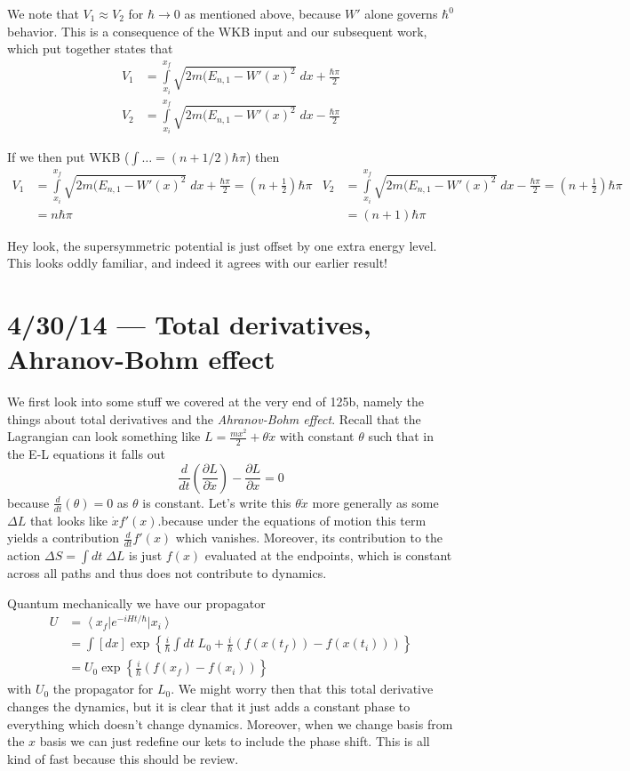 \documentclass[10pt]{report}
\newcommand{\bra}[1]{\left<#1\right|}
\newcommand{\ket}[1]{\left|#1\right>}
\newcommand{\rd}[2]{\frac{d#1}{d#2}}
\newcommand{\pd}[2]{\frac{\partial #1}{\partial#2}}
\begin{document}
We note that $V_1 \approx V_2$ for $\hbar \to 0$ as mentioned above, because $W'$ alone governs $\hbar^0$ behavior. This is a consequence of the WKB input and our subsequent work, which put together states that
\begin{align}
    V_1 &= \int\limits_{x_i}^{x_f}\sqrt{2m(E_{n,1} - W'(x)^2}\;dx + \frac{\hbar \pi}{2}\\
    V_2 &= \int\limits_{x_i}^{x_f}\sqrt{2m(E_{n,1} - W'(x)^2}\;dx - \frac{\hbar \pi}{2}
\end{align}

If we then put WKB ($\int \dots = (n + 1/2)\hbar \pi$) then
\begin{align}
    V_1 &= \int\limits_{x_i}^{x_f}\sqrt{2m(E_{n,1} - W'(x)^2}\;dx + \frac{\hbar \pi}{2} = \left( n + \frac{1}{2} \right)\hbar\pi & V_2 &= \int\limits_{x_i}^{x_f}\sqrt{2m(E_{n,1} - W'(x)^2}\;dx - \frac{\hbar \pi}{2} = \left( n + \frac{1}{2} \right)\hbar \pi\\
    &= n \hbar \pi & &= (n+1) \hbar \pi
\end{align}

Hey look, the supersymmetric potential is just offset by one extra energy level. This looks oddly familiar, and indeed it agrees with our earlier result!
\chapter{4/30/14 --- Total derivatives, Ahranov-Bohm effect}

We first look into some stuff we covered at the very end of 125b, namely the things about total derivatives and the \emph{Ahranov-Bohm effect}. Recall that the Lagrangian can look something like $L = \frac{mx^2}{2} + \theta \dot{x}$ with constant $\theta$ such that in the E-L equations it falls out
\begin{equation}
    \rd{}{t}\left( \pd{L}{\dot{x}} \right) - \pd{L}{x} = 0
\end{equation}
because $\rd{}{t}(\theta) = 0$ as $\theta$ is constant. Let's write this $\theta \dot{x}$ more generally as some $\Delta L$ that looks like $\dot{x}f'(x)$.because under the equations of motion this term yields a contribution $\rd{}{t}f'(x)$ which vanishes. Moreover, its contribution to the action $\Delta S = \int dt\; \Delta L$ is just $f(x)$ evaluated at the endpoints, which is constant across all paths and thus does not contribute to dynamics.

Quantum mechanically we have our propagator
\begin{align}
    U &= \bra{x_f}e^{-iHt/\hbar}\ket{x_i}\\
    &= \int [dx] \exp\left\{ \frac{i}{\hbar}\int dt\; L_0 + \frac{i}{\hbar}\left( f(x(t_f)) - f(x(t_i)) \right) \right\}\\
    &= U_0\exp\left\{ \frac{i}{\hbar}\left( f(x_f) - f(x_i) \right) \right\}
\end{align}
with $U_0$ the propagator for $L_0$. We might worry then that this total derivative changes the dynamics, but it is clear that it just adds a constant phase to everything which doesn't change dynamics. Moreover, when we change basis from the $x$ basis we can just redefine our kets to include the phase shift. This is all kind of fast because this should be review.
\end{document}
